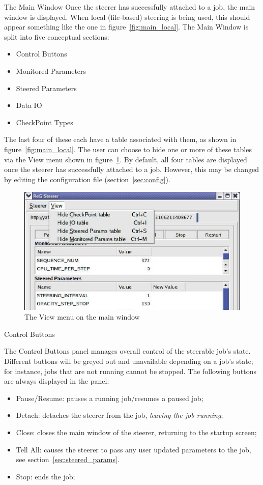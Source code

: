 \documentclass[a4paper,twoside]{article}
\begin{document}
\begin{section}{The Main Window}
Once the steerer has successfully attached to a job, the main window
is displayed.  When local (file-based) steering is being used, this
should appear something like the one in figure~\ref{fig:main_local}.
The Main Window is split into five conceptual sections:
\begin{itemize}
\item Control Buttons
\item Monitored Parameters
\item Steered Parameters
\item Data IO
\item CheckPoint Types
\end{itemize}
The last four of these each have a table associated with them, as
shown in figure~\ref{fig:main_local}.  The user can choose to hide one
or more of these tables via the View menu shown in
figure~\ref{fig:view_menu}.  By default, all four tables are displayed
once the steerer has successfully attached to a job.  However, this
may be changed by editing the configuration file
(section~\ref{sec:config}).

\begin{figure}
\centerline{\includegraphics{main_view_menu.eps}}
\caption{The View menu on the main window}
\label{fig:view_menu}
\end{figure}


\begin{subsection}{Control Buttons}
\label{sec:control_btns}

The Control Buttons panel manages overall control of the steerable
job's state. Different buttons will be greyed out and unavailable
depending on a job's state; for instance, jobs that are not running
cannot be stopped.  The following buttons are always displayed in the
panel:
\begin{itemize}
\item Pause/Resume: pauses a running job/resumes a paused job;
\item Detach: detaches the steerer from the job, \textit{leaving the
job running};
\item Close: closes the main window of the steerer, returning to the
startup screen;
\item Tell All: causes the steerer to pass any user updated
parameters to the job, see section~\ref{sec:steered_params}.
\item Stop: ends the job;
\end{itemize}


\end{subsection}
\end{section}
\end{document}
